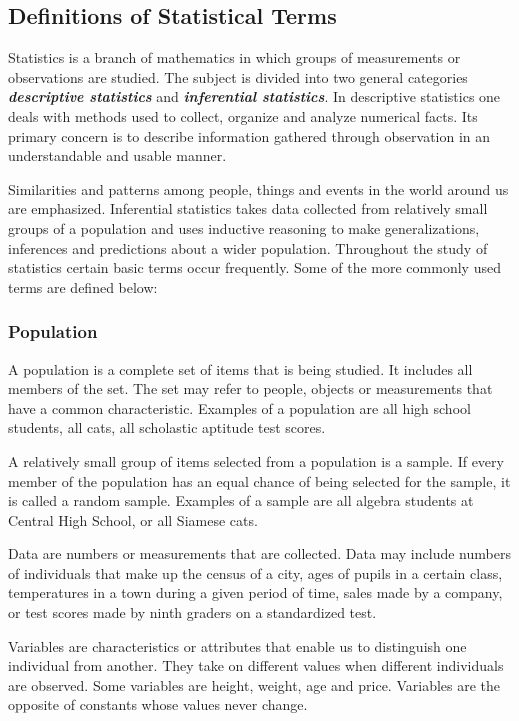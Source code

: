 \documentclass[12pt]{article}
\begin{document}
\subsection*{Definitions of Statistical Terms}

Statistics is a branch of mathematics in which groups of measurements or observations are studied. The subject is divided into two general categories \textit{\textbf{ descriptive statistics}} and \textit{\textbf{inferential statistics}}. In descriptive statistics one deals with methods used to collect, organize and analyze numerical facts. Its primary concern is to describe information gathered through observation in an understandable and usable manner. 

Similarities and patterns among people, things and events in the world around us are emphasized. Inferential statistics takes data collected from relatively small groups of a population and uses inductive reasoning to make generalizations, inferences and predictions about a wider population.
Throughout the study of statistics certain basic terms occur frequently. Some of the more commonly used terms are defined below:

\subsubsection*{Population}
A population is a complete set of items that is being studied. It includes all members of the set. The set may refer to people, objects or measurements that have a common characteristic. Examples of a population are all high school students, all cats, all scholastic aptitude test scores.

A relatively small group of items selected from a population is a sample. If every member of the population has an equal chance of being selected for the sample, it is called a random sample. Examples of a sample are all algebra students at Central High School, or all Siamese cats.

Data are numbers or measurements that are collected. Data may include numbers of individuals that make up the census of a city, ages of pupils in a certain class, temperatures in a town during a given period of time, sales made by a company, or test scores made by ninth graders on a standardized test.

Variables are characteristics or attributes that enable us to distinguish one individual from another. They take on different values when different individuals are observed. Some variables are height, weight, age and price. Variables are the opposite of constants whose values never change.
\end{document}
